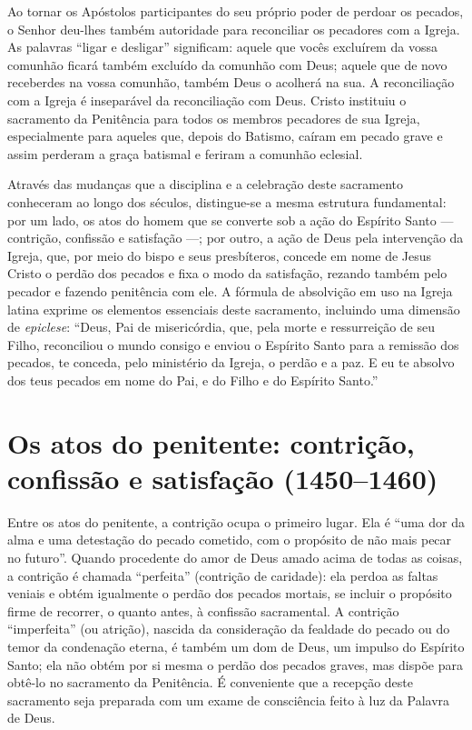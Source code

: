 Ao tornar os Apóstolos participantes do seu próprio poder de perdoar os pecados, o Senhor deu-lhes também autoridade para reconciliar os pecadores com a Igreja. As palavras ``ligar e desligar'' significam: aquele que vocês excluírem da vossa comunhão ficará também excluído da comunhão com Deus; aquele que de novo receberdes na vossa comunhão, também Deus o acolherá na sua. A reconciliação com a Igreja é inseparável da reconciliação com Deus. Cristo instituiu o sacramento da Penitência para todos os membros pecadores de sua Igreja, especialmente para aqueles que, depois do Batismo, caíram em pecado grave e assim perderam a graça batismal e feriram a comunhão eclesial.

Através das mudanças que a disciplina e a celebração deste sacramento conheceram ao longo dos séculos, distingue-se a mesma estrutura fundamental: por um lado, os atos do homem que se converte sob a ação do Espírito Santo --- contrição, confissão e satisfação ---; por outro, a ação de Deus pela intervenção da Igreja, que, por meio do bispo e seus presbíteros, concede em nome de Jesus Cristo o perdão dos pecados e fixa o modo da satisfação, rezando também pelo pecador e fazendo penitência com ele. A fórmula de absolvição em uso na Igreja latina exprime os elementos essenciais deste sacramento, incluindo uma dimensão de \emph{epiclese}: ``Deus, Pai de misericórdia, que, pela morte e ressurreição de seu Filho, reconciliou o mundo consigo e enviou o Espírito Santo para a remissão dos pecados, te conceda, pelo ministério da Igreja, o perdão e a paz. E eu te absolvo dos teus pecados em nome do Pai, e do Filho e do Espírito Santo.''

\section{Os atos do penitente: contrição, confissão e satisfação (1450--1460)}

Entre os atos do penitente, a contrição ocupa o primeiro lugar. Ela é ``uma dor da alma e uma detestação do pecado cometido, com o propósito de não mais pecar no futuro''. Quando procedente do amor de Deus amado acima de todas as coisas, a contrição é chamada ``perfeita'' (contrição de caridade): ela perdoa as faltas veniais e obtém igualmente o perdão dos pecados mortais, se incluir o propósito firme de recorrer, o quanto antes, à confissão sacramental. A contrição ``imperfeita'' (ou atrição), nascida da consideração da fealdade do pecado ou do temor da condenação eterna, é também um dom de Deus, um impulso do Espírito Santo; ela não obtém por si mesma o perdão dos pecados graves, mas dispõe para obtê-lo no sacramento da Penitência. É conveniente que a recepção deste sacramento seja preparada com um exame de consciência feito à luz da Palavra de Deus.


